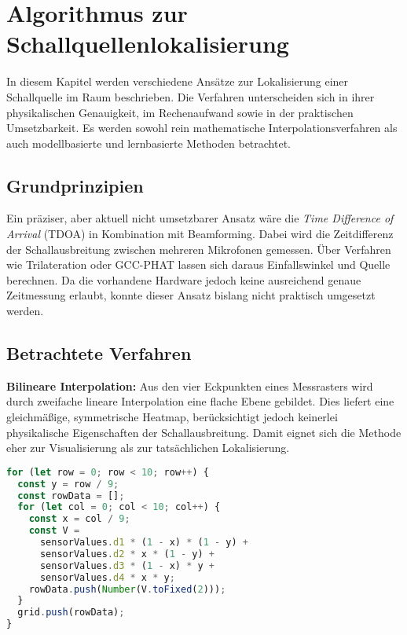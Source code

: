 \chapter{Algorithmus zur Schallquellenlokalisierung}

In diesem Kapitel werden verschiedene Ansätze zur Lokalisierung einer Schallquelle im Raum beschrieben. Die Verfahren unterscheiden sich in ihrer physikalischen Genauigkeit, im Rechenaufwand sowie in der praktischen Umsetzbarkeit. Es werden sowohl rein mathematische Interpolationsverfahren als auch modellbasierte und lernbasierte Methoden betrachtet.

\section{Grundprinzipien}

Ein präziser, aber aktuell nicht umsetzbarer Ansatz wäre die \textit{Time Difference of Arrival} (TDOA) in Kombination mit Beamforming. Dabei wird die Zeitdifferenz der Schallausbreitung zwischen mehreren Mikrofonen gemessen. Über Verfahren wie Trilateration oder GCC-PHAT lassen sich daraus Einfallswinkel und Quelle berechnen.  
Da die vorhandene Hardware jedoch keine ausreichend genaue Zeitmessung erlaubt, konnte dieser Ansatz bislang nicht praktisch umgesetzt werden.

\section{Betrachtete Verfahren}

\textbf{Bilineare Interpolation:}  
Aus den vier Eckpunkten eines Messrasters wird durch zweifache lineare Interpolation eine flache Ebene gebildet. Dies liefert eine gleichmäßige, symmetrische Heatmap, berücksichtigt jedoch keinerlei physikalische Eigenschaften der Schallausbreitung. Damit eignet sich die Methode eher zur Visualisierung als zur tatsächlichen Lokalisierung.
\begin{lstlisting}[language=JavaScript, caption={Bilineare Interpolation}]
for (let row = 0; row < 10; row++) {
  const y = row / 9;
  const rowData = [];
  for (let col = 0; col < 10; col++) {
    const x = col / 9;
    const V =
      sensorValues.d1 * (1 - x) * (1 - y) +
      sensorValues.d2 * x * (1 - y) +
      sensorValues.d3 * (1 - x) * y +
      sensorValues.d4 * x * y;
    rowData.push(Number(V.toFixed(2)));
  }
  grid.push(rowData);
}
\end{lstlisting}

